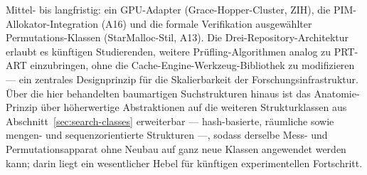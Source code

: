 \medskip
Mittel- bis langfristig: ein GPU-Adapter (Grace-Hopper-Cluster, ZIH), die PIM-Allokator-Integration
(A16) und die formale Verifikation ausgewählter Permutations-Klassen (StarMalloc-Stil, A13). Die
Drei-Repository-Architektur erlaubt es künftigen Studierenden, weitere Prüfling-Algorithmen analog
zu PRT-ART einzubringen, ohne die Cache-Engine-Werkzeug-Bibliothek zu modifizieren --- ein zentrales
Designprinzip für die Skalierbarkeit der Forschungsinfrastruktur. Über die hier behandelten
baumartigen Suchstrukturen hinaus ist das Anatomie-Prinzip über höherwertige Abstraktionen auf die
weiteren Strukturklassen aus Abschnitt~\ref{sec:search-classes} erweiterbar --- hash-basierte,
räumliche sowie mengen- und sequenzorientierte Strukturen ---, sodass derselbe Mess- und
Permutationsapparat ohne Neubau auf ganz neue Klassen angewendet werden kann; darin liegt ein
wesentlicher Hebel für künftigen experimentellen Fortschritt.
